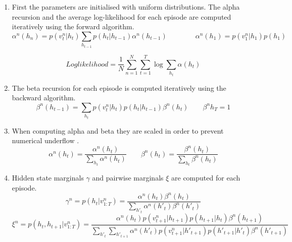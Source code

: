 \documentclass[a4paper, 11pt]{article}
\begin{document}
\begin{enumerate}


\item First the parameters are initialised with uniform distributions. The alpha recursion and the average log-likelihood for each episode are computed iteratively using the forward algorithm.
\begin{equation}
\alpha^n(h_n) = p(v_t^n|h_t)\sum\limits_{h_{t-1}}p(h_t|h_{t-1})\alpha^n(h_{t-1}) \qquad \qquad \alpha^n(h_1)=p(v_1^n|h_1)p(h_1)
\end{equation}

\begin{equation}
Log likelihood=\frac{1}{N} \sum\limits_{n=1}^N \sum\limits_{t=1}^T \log\sum\limits_{h_t} \alpha(h_t) 
\end{equation}

\item The beta recursion for each episode is computed iteratively using the backward algorithm.
\begin{equation}
\beta^n(h_{t-1})=\sum\limits_{h_t} p(v_t^n|h_t)p(h_t|h_{t-1}) \beta^n(h_t) \qquad \beta^n{h_T}=1
\end{equation}

\item When computing alpha and beta they are scaled in order to prevent numerical underflow \cite{Rabiner1989}.
\begin{equation}
\alpha^n(h_t)= \frac{\alpha^n(h_t)}{\sum\limits_{h_t}\alpha^n(h_t)} \qquad \beta^n(h_t) = \frac{\beta^n(h_t)}{\sum\limits_{h_t}\beta^n(h_t)}
\end{equation}

\item Hidden state marginals $\gamma$ and pairwise marginals $\xi$ are computed for each episode.
\begin{equation}
\gamma^n = p(h_t|v_{1:T}^n) = \frac{\alpha^n(h_t)\beta^n(h_t)}{\sum\limits_{h'_t} \alpha^n(h'_t)\beta^n(h'_t)}
\end{equation}
\begin{equation}
\xi^n = p(h_t,h_{t+1}|v^n_{1:T}) = \frac{
\alpha^n(h_t) p(v_{t+1}^n|h_{t+1}) p(h_{t+1}|h_t) \beta^n(h_{t+1})} 
{\sum\limits_{h'_t}\sum\limits_{h'_{t+1}}\alpha^n(h'_t) p(v_{t+1}^n|h'_{t+1}) p(h'_{t+1}|h'_t) \beta^n(h'_{t+1})}
\end{equation}


\end{enumerate}
\end{document}
